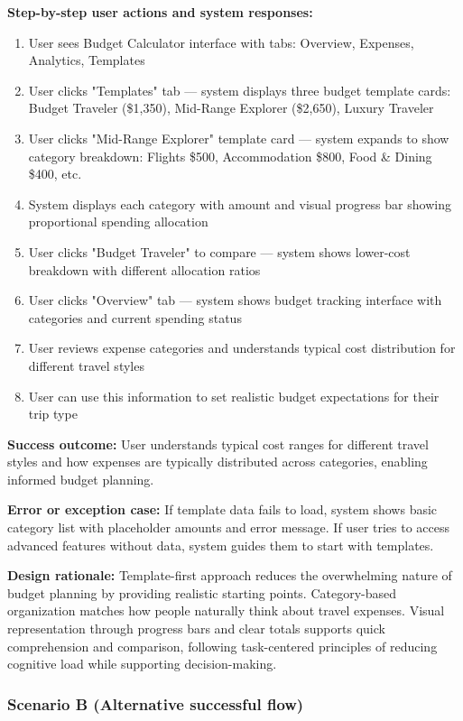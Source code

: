 \documentclass[11pt,a4paper]{article}
\begin{document}
\textbf{Step-by-step user actions and system responses:}
\begin{enumerate}
\item User sees Budget Calculator interface with tabs: Overview, Expenses, Analytics, Templates
\item User clicks "Templates" tab — system displays three budget template cards: Budget Traveler (\$1,350), Mid-Range Explorer (\$2,650), Luxury Traveler
\item User clicks "Mid-Range Explorer" template card — system expands to show category breakdown: Flights \$500, Accommodation \$800, Food \& Dining \$400, etc.
\item System displays each category with amount and visual progress bar showing proportional spending allocation
\item User clicks "Budget Traveler" to compare — system shows lower-cost breakdown with different allocation ratios
\item User clicks "Overview" tab — system shows budget tracking interface with categories and current spending status
\item User reviews expense categories and understands typical cost distribution for different travel styles
\item User can use this information to set realistic budget expectations for their trip type
\end{enumerate}

\textbf{Success outcome:} User understands typical cost ranges for different travel styles and how expenses are typically distributed across categories, enabling informed budget planning.

\textbf{Error or exception case:} If template data fails to load, system shows basic category list with placeholder amounts and error message. If user tries to access advanced features without data, system guides them to start with templates.

\textbf{Design rationale:} Template-first approach reduces the overwhelming nature of budget planning by providing realistic starting points. Category-based organization matches how people naturally think about travel expenses. Visual representation through progress bars and clear totals supports quick comprehension and comparison, following task-centered principles of reducing cognitive load while supporting decision-making.

\subsubsection*{Scenario B (Alternative successful flow)}
\end{document}
